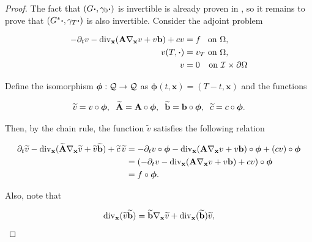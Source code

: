 \begin{proof}
    The fact that $(G\boldsymbol{\cdot},\gamma_0\boldsymbol{\cdot})$ is invertible is already proven in \cite[Theorem 2.3]{gantner2021further}, so it remains to prove that $(G^*\boldsymbol{\cdot},\gamma_T\boldsymbol{\cdot})$ is also invertible. Consider the adjoint problem

    \begin{subequations}
        \begin{align}
            -\partial_tv-\operatorname{div}_{\mathbf{x}}(\mathbf{A}\nabla_{\mathbf{x}}v+v\mathbf{b})+cv&=f \hspace{0.18 cm}\text{ on }\Omega,\\
            v(T,\boldsymbol{\cdot})&=v_T \text{ on }\Omega,\\v&=0 \hspace{0.25 cm}\text{ on }\mathcal{I}\times\partial\Omega
        \end{align}
    \end{subequations}

     Define the isomorphism $\boldsymbol{\phi}:\mathcal{Q}\to\mathcal{Q}$ as $\boldsymbol{\phi}(t,\mathbf{x})=(T-t,\mathbf{x})$ and the functions

     $$\widetilde{v}=v\circ\boldsymbol{\phi},\hspace{0.2 cm}\widetilde{\mathbf{A}}=\mathbf{A}\circ\boldsymbol{\phi},\hspace{0.2 cm}\widetilde{\mathbf{b}}=\mathbf{b}\circ\boldsymbol{\phi},\hspace{0.2 cm}\widetilde{c}=c\circ\boldsymbol{\phi}.$$
     
    Then, by the chain rule, the function $\widetilde{v}$ satisfies the following relation

     \begin{align*}
         \partial_t\widetilde{v}-\operatorname{div}_{\mathbf{x}}(\widetilde{\mathbf{A}}\nabla_{\mathbf{x}}\widetilde{v}+\widetilde{v}\widetilde{\mathbf{b}})+\widetilde{c}\,\widetilde{v}&=-\partial_tv\circ\boldsymbol{\phi}-\operatorname{div}_{\mathbf{x}}(\mathbf{A}\nabla_{\mathbf{x}}v+v\mathbf{b})\circ\boldsymbol{\phi}+(cv)\circ\boldsymbol{\phi}\\
         &=(-\partial_tv-\operatorname{div}_{\mathbf{x}}(\mathbf{A}\nabla_{\mathbf{x}}v+v\mathbf{b})+cv)\circ\boldsymbol{\phi}\\
         &=f\circ\boldsymbol{\phi}.
     \end{align*}

    Also, note that

    $$\operatorname{div}_{\mathbf{x}}(\widetilde{v}\widetilde{\mathbf{b}})=\widetilde{\mathbf{b}}\nabla_{\mathbf{x}}\widetilde{v}+\operatorname{div}_{\mathbf{x}}(\widetilde{\mathbf{b}})\widetilde{v},$$


\end{proof}
